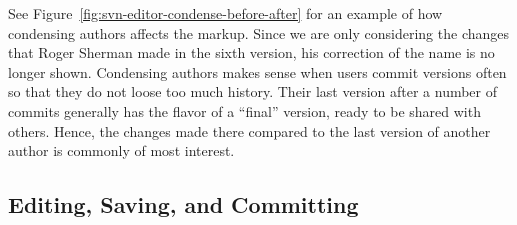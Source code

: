 See Figure~\ref{fig:svn-editor-condense-before-after} for an example of how condensing authors affects the markup.  Since we are only considering the changes that Roger Sherman made in the sixth version, his correction of the name is no longer shown.  Condensing authors makes sense when users commit versions often so that they do not loose too much history.  Their last version after a number of commits generally has the flavor of a ``final'' version, ready to be shared with others.  Hence, the changes made there compared to the last version of another author is commonly of most interest.

\subsection{Editing, Saving, and Committing}

